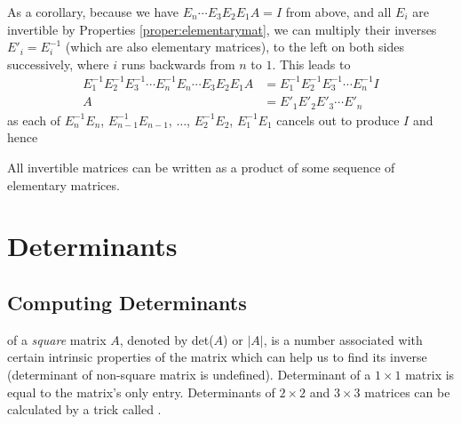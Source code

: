 As a corollary, because we have $E_n \cdots E_{3}E_{2}E_{1}A = I$ from above, and all $E_i$ are invertible by Properties \ref{proper:elementarymat}, we can multiply their inverses $E'_i = E_i^{-1}$ (which are also elementary matrices), to the left on both sides successively, where $i$ runs backwards from $n$ to $1$. This leads to
\begin{align*}
E_{1}^{-1}E_{2}^{-1}E_{3}^{-1}\cdots E_n^{-1}E_n \cdots E_{3}E_{2}E_{1}A &= E_{1}^{-1}E_{2}^{-1}E_{3}^{-1}\cdots E_n^{-1}I \\
A &= E'_{1}E'_{2}E'_{3}\cdots E'_n
\end{align*}
as each of $E_n^{-1}E_n$, $E_{n-1}^{-1}E_{n-1}$, $\ldots$, $E_2^{-1}E_2$, $E_1^{-1}E_1$ cancels out to produce $I$ and hence
\begin{proper}
\label{proper:invseqelement}
All invertible matrices can be written as a product of some sequence of elementary matrices. 
\end{proper}

\section{Determinants}
\label{section:det}
\subsection{Computing Determinants}
 of a \textit{square} matrix $A$, denoted by det($A$) or $|A|$, is a number associated with certain intrinsic properties of the matrix which can help us to find its inverse (determinant of non-square matrix is undefined). Determinant of a $1 \times 1$ matrix is equal to the matrix's only entry. Determinants of $2 \times 2$ and $3 \times 3$ matrices can be calculated by a trick called .
